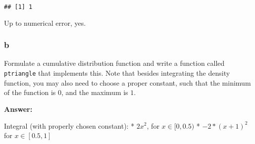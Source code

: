 \documentclass[]{article}
\newenvironment{Shaded}{\begin{snugshade}}{\end{snugshade}}
\newcommand{\ControlFlowTok}[1]{\textcolor[rgb]{0.13,0.29,0.53}{\textbf{#1}}}
\newcommand{\DataTypeTok}[1]{\textcolor[rgb]{0.13,0.29,0.53}{#1}}
\newcommand{\DecValTok}[1]{\textcolor[rgb]{0.00,0.00,0.81}{#1}}
\newcommand{\FloatTok}[1]{\textcolor[rgb]{0.00,0.00,0.81}{#1}}
\newcommand{\KeywordTok}[1]{\textcolor[rgb]{0.13,0.29,0.53}{\textbf{#1}}}
\newcommand{\NormalTok}[1]{#1}
\newcommand{\OperatorTok}[1]{\textcolor[rgb]{0.81,0.36,0.00}{\textbf{#1}}}
\newcommand{\StringTok}[1]{\textcolor[rgb]{0.31,0.60,0.02}{#1}}
\begin{document}
\begin{verbatim}
## [1] 1
\end{verbatim}

Up to numerical error, yes.

\hypertarget{b-10}{%
\subsubsection{b}\label{b-10}}

Formulate a cumulative distribution function and write a function called
\texttt{ptriangle} that implements this. Note that besides integrating
the density function, you may also need to choose a proper constant,
such that the minimum of the function is \(0\), and the maximum is
\(1\).

\textbf{Answer:}

Integral (with properly chosen constant): * \(2x^2\), for
\(x\in [0, 0.5)\) * \(-2*(x+1)^2\) for \(x\in [0.5, 1]\)

\begin{Shaded}
\end{Shaded}
\end{document}
